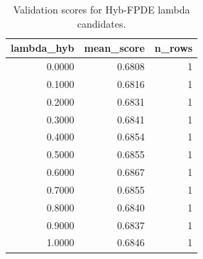 \begin{table}[t]
\caption{Validation scores for Hyb-FPDE lambda candidates.}
\label{tab:lambda_distribution_computed}
\centering
\begin{tabular}{rrr}
\toprule
lambda\_hyb & mean\_score & n\_rows \\
\midrule
0.0000 & 0.6808 & 1 \\
0.1000 & 0.6816 & 1 \\
0.2000 & 0.6831 & 1 \\
0.3000 & 0.6841 & 1 \\
0.4000 & 0.6854 & 1 \\
0.5000 & 0.6855 & 1 \\
0.6000 & 0.6867 & 1 \\
0.7000 & 0.6855 & 1 \\
0.8000 & 0.6840 & 1 \\
0.9000 & 0.6837 & 1 \\
1.0000 & 0.6846 & 1 \\
\bottomrule
\end{tabular}

\end{table}
